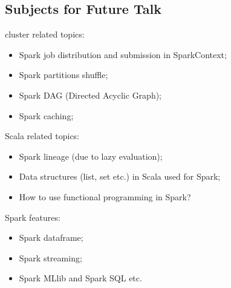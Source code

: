 \documentclass[notheorems, aspectratio=54]{beamer}
\begin{document}
\subsection{Subjects for Future Talk}
\begin{frame}

\begin{block}{cluster related topics:}
 \begin{itemize}
 \item Spark job distribution and submission in SparkContext;
 \item Spark partitions shuffle;
 \item Spark DAG (Directed Acyclic Graph);
 \item Spark caching; 
\end{itemize}
\end{block}

\begin{block}{Scala related topics:}
  \begin{itemize}
  \item Spark lineage (due to lazy evaluation);
  \item Data structures (list, set etc.) in Scala used for Spark;
  \item How to use functional programming in Spark?
\end{itemize}
\end{block}

\end{frame}


\begin{frame}


\begin{block}{Spark features:}
 \begin{itemize}
  \item Spark dataframe;
  \item Spark streaming;
  \item Spark MLlib and Spark SQL etc.
 \end{itemize}

\end{block}

\end{frame}


\end{document}

